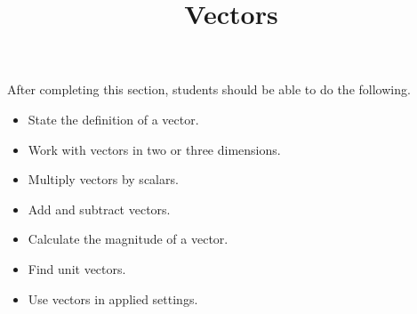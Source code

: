 \documentclass{ximera}
\title{Vectors}
\begin{document}
\begin{abstract}
\end{abstract}

\maketitle

\begin{sectionOutcomes}

After completing this section, students should be able to do the following.

\begin{itemize}
\item State the definition of a vector.
\item Work with vectors in two or three dimensions.
\item Multiply vectors by scalars. 
\item Add and subtract vectors.
\item Calculate the magnitude of a vector.
\item Find unit vectors.
\item Use vectors in applied settings.
\end{itemize}

\end{sectionOutcomes}
\end{document}
